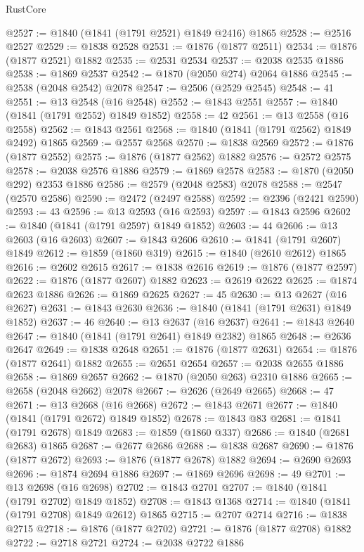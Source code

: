 \begin{lexlean}{RustCore}
\begin{coremodule}
@2527 := @1840 (@1841 (@1791 @2521) @1849 @2416) @1865
@2528 := @2516 @2527
@2529 := @1838 @2528
@2531 := @1876 (@1877 @2511)
@2534 := @1876 (@1877 @2521) @1882
@2535 := @2531 @2534
@2537 := @2038 @2535 @1886
@2538 := @1869 @2537
@2542 := @1870 (@2050 @274) @2064 @1886
@2545 := @2538 (@2048 @2542) @2078
@2547 := @2506 (@2529 @2545)
@2548 := 41
@2551 := @13 @2548 (@16 @2548)
@2552 := @1843 @2551
@2557 := @1840 (@1841 (@1791 @2552) @1849 @1852)
@2558 := 42
@2561 := @13 @2558 (@16 @2558)
@2562 := @1843 @2561
@2568 := @1840 (@1841 (@1791 @2562) @1849 @2492) @1865
@2569 := @2557 @2568
@2570 := @1838 @2569
@2572 := @1876 (@1877 @2552)
@2575 := @1876 (@1877 @2562) @1882
@2576 := @2572 @2575
@2578 := @2038 @2576 @1886
@2579 := @1869 @2578
@2583 := @1870 (@2050 @292) @2353 @1886
@2586 := @2579 (@2048 @2583) @2078
@2588 := @2547 (@2570 @2586)
@2590 := @2472 (@2497 @2588)
@2592 := @2396 (@2421 @2590)
@2593 := 43
@2596 := @13 @2593 (@16 @2593)
@2597 := @1843 @2596
@2602 := @1840 (@1841 (@1791 @2597) @1849 @1852)
@2603 := 44
@2606 := @13 @2603 (@16 @2603)
@2607 := @1843 @2606
@2610 := @1841 (@1791 @2607) @1849
@2612 := @1859 (@1860 @319)
@2615 := @1840 (@2610 @2612) @1865
@2616 := @2602 @2615
@2617 := @1838 @2616
@2619 := @1876 (@1877 @2597)
@2622 := @1876 (@1877 @2607) @1882
@2623 := @2619 @2622
@2625 := @1874 @2623 @1886
@2626 := @1869 @2625
@2627 := 45
@2630 := @13 @2627 (@16 @2627)
@2631 := @1843 @2630
@2636 := @1840 (@1841 (@1791 @2631) @1849 @1852)
@2637 := 46
@2640 := @13 @2637 (@16 @2637)
@2641 := @1843 @2640
@2647 := @1840 (@1841 (@1791 @2641) @1849 @2382) @1865
@2648 := @2636 @2647
@2649 := @1838 @2648
@2651 := @1876 (@1877 @2631)
@2654 := @1876 (@1877 @2641) @1882
@2655 := @2651 @2654
@2657 := @2038 @2655 @1886
@2658 := @1869 @2657
@2662 := @1870 (@2050 @263) @2310 @1886
@2665 := @2658 (@2048 @2662) @2078
@2667 := @2626 (@2649 @2665)
@2668 := 47
@2671 := @13 @2668 (@16 @2668)
@2672 := @1843 @2671
@2677 := @1840 (@1841 (@1791 @2672) @1849 @1852)
@2678 := @1843 @83
@2681 := @1841 (@1791 @2678) @1849
@2683 := @1859 (@1860 @337)
@2686 := @1840 (@2681 @2683) @1865
@2687 := @2677 @2686
@2688 := @1838 @2687
@2690 := @1876 (@1877 @2672)
@2693 := @1876 (@1877 @2678) @1882
@2694 := @2690 @2693
@2696 := @1874 @2694 @1886
@2697 := @1869 @2696
@2698 := 49
@2701 := @13 @2698 (@16 @2698)
@2702 := @1843 @2701
@2707 := @1840 (@1841 (@1791 @2702) @1849 @1852)
@2708 := @1843 @1368
@2714 := @1840 (@1841 (@1791 @2708) @1849 @2612) @1865
@2715 := @2707 @2714
@2716 := @1838 @2715
@2718 := @1876 (@1877 @2702)
@2721 := @1876 (@1877 @2708) @1882
@2722 := @2718 @2721
@2724 := @2038 @2722 @1886

\end{coremodule}
\end{lexlean}
